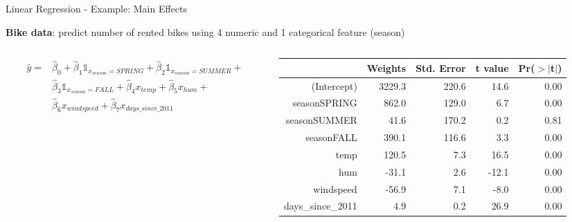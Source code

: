 \documentclass[11pt,compress,t,notes=noshow, aspectratio=169, xcolor=table]{beamer}
\begin{document}
\begin{frame}{Linear Regression - Example: Main Effects}

\textbf{Bike data}: predict number of rented bikes using 4 numeric and 1 categorical feature (season)
\begin{columns}[T, totalwidth=\linewidth]
\begin{column}{0.52\textwidth}
\begin{align*}
\hat y = 
& \hat \beta_0 + 
\hat \beta_1 \mathds{1}_{x_{season} = SPRING} +
\hat \beta_2 \mathds{1}_{x_{season} = SUMMER} +\\
& 
\hat \beta_3 \mathds{1}_{x_{season} = FALL} + 
\hat \beta_4 x_{temp} + 
\hat \beta_5 x_{hum} + \\
& 
\hat \beta_6 x_{windspeed} + 
\hat \beta_7 x_{days\_since\_2011}
\end{align*}
\end{column}
\begin{column}{0.47\textwidth}
  \centering
\begin{tiny}
\begin{table}[ht]
\begin{tabular}{rrrrr}
  \hline
 & Weights & Std. Error & t value & Pr($>$$|$t$|$) \\

  \hline
(Intercept) & 3229.3 & 220.6 & 14.6 & 0.00 \\ 
  seasonSPRING & 862.0 & 129.0 & 6.7 & 0.00 \\ 
  seasonSUMMER & 41.6 & 170.2 & 0.2 & 0.81 \\ 
  seasonFALL & 390.1 & 116.6 & 3.3 & 0.00 \\ 
  temp & 120.5 & 7.3 & 16.5 & 0.00 \\ 
  hum & -31.1 & 2.6 & -12.1 & 0.00 \\ 
  windspeed & -56.9 & 7.1 & -8.0 & 0.00 \\ 
  days\_since\_2011 & 4.9 & 0.2 & 26.9 & 0.00 \\
   \hline
\end{tabular}
\end{table}
\end{tiny}
\end{column}
\end{columns}
\pause


\end{frame}
\end{document}
